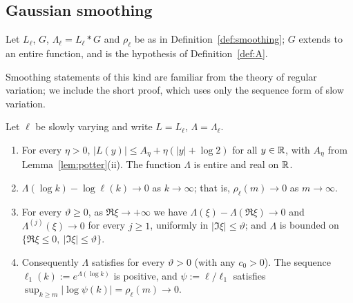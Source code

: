 \subsection{Gaussian smoothing}\label{sec:smoothing-gauss}

Let $L_\ell$, $G$, $\Lambda_\ell=L_\ell*G$ and $\rho_\ell$ be as in Definition~\ref{def:smoothing}; $G$ extends to an
entire function, and \Ath{\vartheta} is the hypothesis of Definition~\ref{def:A}.

Smoothing statements of this kind are familiar from the theory of regular variation; we include the short proof,
which uses only the sequence form of slow variation.

\begin{lemma}\label{lem:smoothing}
Let $\ell$ be slowly varying and write $L=L_\ell$, $\Lambda=\Lambda_\ell$.
\begin{enumerate}
\item[\textup{(o)}] For every $\eta>0$, $|L(y)|\le A_\eta+\eta(|y|+\log2)$ for all $y\in\mathbb{R}$, with $A_\eta$ from
  Lemma~\ref{lem:potter}(ii). The function $\Lambda$ is entire and real on $\mathbb{R}$.
\item[\textup{(i)}] $\Lambda(\log k)-\log\ell(k)\to0$ as $k\to\infty$; that is, $\rho_\ell(m)\to0$ as $m\to\infty$.
\item[\textup{(ii)}] For every $\vartheta\ge0$, as $\Re\xi\to+\infty$ we have $\Lambda(\xi)-\Lambda(\Re\xi)\to0$ and
  $\Lambda^{(j)}(\xi)\to0$ for every $j\ge1$, uniformly in $|\Im\xi|\le\vartheta$; and $\Lambda$ is bounded on
  $\{\Re\xi\le0,\ |\Im\xi|\le\vartheta\}$.
\item[\textup{(iii)}] Consequently $\Lambda$ satisfies \Ath{\vartheta} for every $\vartheta>0$ (with any $c_0>0$). The sequence
  $\ell_1(k):=e^{\Lambda(\log k)}$ is positive, and $\psi:=\ell/\ell_1$ satisfies
  $\sup_{k\ge m}|\log\psi(k)|=\rho_\ell(m)\to0$.
\end{enumerate}
\end{lemma}

